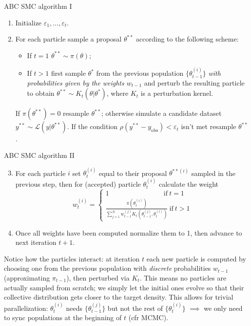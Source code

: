 \documentclass{beamer}
\theoremstyle{remark}
\newcommand{\nologo}{\setbeamertemplate{logo}{}} %
\renewcommand{\L}{\mathcal{L}}
\begin{document}
\begin{frame}{ABC SMC algorithm I}
\begin{enumerate}[<+->]
    \item Initialize $\varepsilon_1, \dots, \varepsilon_t$.
    \item For each particle sample a proposal $\theta^{**}$ according to the following scheme:
    \begin{itemize}
        \item If $t = 1$ $\theta^{**} \sim \pi(\theta)$;
        \item If $t > 1$ first sample $\theta^*$ from the previous population $\{\theta_{t-1}^{(i)}\}$ \emph{with probabilities given by the weights $w_{t-1}$} and perturb the resulting particle to obtain $\theta^{**}\sim K_t(\theta|\theta^*)$, where $K_t$ is a perturbation kernel.
    \end{itemize}
    \pause[\thebeamerpauses]
    If $\pi(\theta^{**}) = 0$ resample $\theta^{**}$; otherwise simulate a candidate dataset $y^{**}\sim \L(y|\theta^{**})$. If the condition $\rho(y^{**} - y_{\text{obs}}) < \varepsilon_t$ isn't met resample $\theta^{**}$.
\end{enumerate}
\end{frame}
{\nologo
\begin{frame}{ABC SMC algorithm II}
\begin{enumerate}[<+->]
    \setcounter{enumi}{2}
    \item For each particle $i$ set $\theta_t^{(i)}$ equal to their proposal $\theta^{**(i)}$ sampled in the previous step, then for (accepted) particle $\theta_t^{(i)}$ calculate the weight
    \begin{equation*}
        w_t^{(i)} =
        \begin{cases}
            1 \qquad \qquad \qquad \qquad \text{if} \ t = 1\\
            \frac{\pi(\theta_t^{(i)})}{\sum_{j=1}^N w_{t-1}^{(j)} K_t(\theta_{t-1}^{(j)}, \theta_t^{(i)})} \ \text{if} \ t > 1
        \end{cases}
    \end{equation*}
    \item Once all weights have been computed normalize them to 1, then advance to next iteration $t+1$.
\end{enumerate}
\pause[\thebeamerpauses]
Notice how the particles interact: at iteration $t$ each new particle is computed by choosing one from the previous population with \emph{discrete} probabilities $w_{t-1}$ (approximating $\pi_{t-1}$), then perturbed via $K_t$. This means no particles are actually sampled from scratch; we simply let the initial ones evolve so that their collective distribution gets closer to the target density. This allows for trivial parallelization: $\theta_t^{(i)}$ needs $\{\theta_{t-1}^{(j)}\}$ but not the rest of $\{\theta_t^{(i)}\}$ $\implies$ we only need to sync populations at the beginning of $t$ (cfr MCMC).
\end{frame}
}
\end{document}
